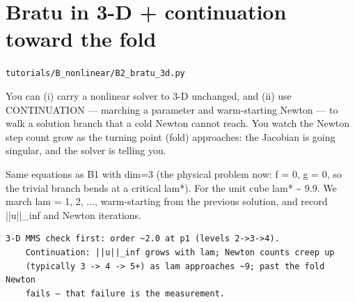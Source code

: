 \chapter{Bratu in 3-D + continuation toward the fold}
\label{ch:B2_bratu_3d}
\noindent\texttt{tutorials/B\_nonlinear/B2\_bratu\_3d.py}\\[0.75em]
\begin{outcome}
You can (i) carry a nonlinear solver to 3-D unchanged,
and (ii) use CONTINUATION — marching a parameter and warm-starting Newton —
to walk a solution branch that a cold Newton cannot reach. You watch the
Newton step count grow as the turning point (fold) approaches: the
Jacobian is going singular, and the solver is telling you.
\end{outcome}

Same equations as B1 with dim=3 (the physical problem now:
f = 0, g = 0, so the trivial branch bends at a critical lam*). For the
unit cube lam* \textasciitilde{} 9.9. We march lam = 1, 2, ..., warm-starting from the
previous solution, and record ||u||\_inf and Newton iterations.

\begin{expected}
\begin{verbatim}
3-D MMS check first: order ~2.0 at p1 (levels 2->3->4).
    Continuation: ||u||_inf grows with lam; Newton counts creep up
    (typically 3 -> 4 -> 5+) as lam approaches ~9; past the fold Newton
    fails — that failure is the measurement.
\end{verbatim}
\end{expected}

